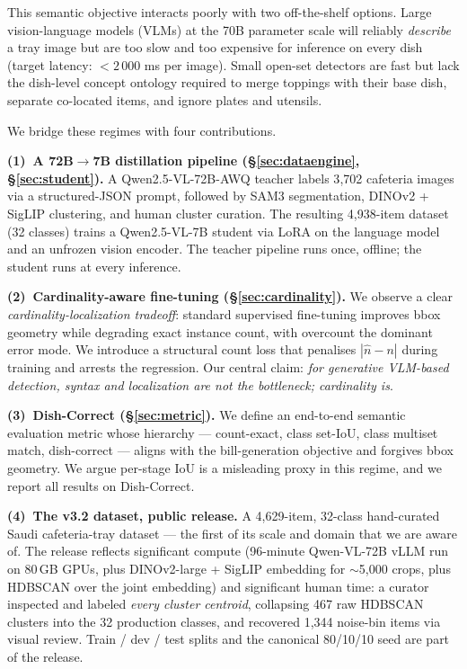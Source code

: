 \documentclass[10pt,twocolumn,letterpaper]{article}
\begin{document}
This semantic objective interacts poorly with two off-the-shelf options.
Large vision-language models (VLMs) at the 70B parameter scale will reliably
\emph{describe} a tray image but are too slow and too expensive for inference
on every dish (target latency: $<2{\,}000$ ms per image). Small open-set
detectors are fast but lack the dish-level concept ontology required to merge
toppings with their base dish, separate co-located items, and ignore plates
and utensils.

We bridge these regimes with four contributions.

\textbf{(1)~A 72B$\rightarrow$7B distillation pipeline (\S\ref{sec:dataengine},
\S\ref{sec:student}).} A Qwen2.5-VL-72B-AWQ teacher labels 3{,}702 cafeteria
images via a structured-JSON prompt, followed by SAM3 segmentation, DINOv2 +
SigLIP clustering, and human cluster curation. The resulting 4{,}938-item
dataset (32 classes) trains a Qwen2.5-VL-7B student via LoRA on the language
model and an unfrozen vision encoder. The teacher pipeline runs once,
offline; the student runs at every inference.

\textbf{(2)~Cardinality-aware fine-tuning (\S\ref{sec:cardinality}).} We
observe a clear \emph{cardinality-localization tradeoff}: standard supervised
fine-tuning improves bbox geometry while degrading exact instance count, with
overcount the dominant error mode. We introduce a structural count loss
that penalises $|\hat{n} - n|$ during training and arrests the regression.
Our central claim: \emph{for generative VLM-based detection, syntax and
localization are not the bottleneck; cardinality is}.

\textbf{(3)~Dish-Correct (\S\ref{sec:metric}).} We define an end-to-end
semantic evaluation metric whose hierarchy --- count-exact, class set-IoU,
class multiset match, dish-correct --- aligns with the bill-generation
objective and forgives bbox geometry. We argue per-stage IoU is a misleading
proxy in this regime, and we report all results on Dish-Correct.

\textbf{(4)~The v3.2 dataset, public release.} A 4{,}629-item, 32-class
hand-curated Saudi cafeteria-tray dataset --- the first of its scale and
domain that we are aware of. The release reflects significant compute
(96-minute Qwen-VL-72B vLLM run on 80\,GB GPUs, plus DINOv2-large +
SigLIP embedding for $\sim$5{,}000 crops, plus HDBSCAN over the joint
embedding) and significant human time: a curator inspected and labeled
\emph{every cluster centroid}, collapsing 467 raw HDBSCAN clusters into
the 32 production classes, and recovered 1{,}344 noise-bin items via
visual review. Train / dev / test splits and the canonical 80/10/10 seed
are part of the release.
\end{document}
